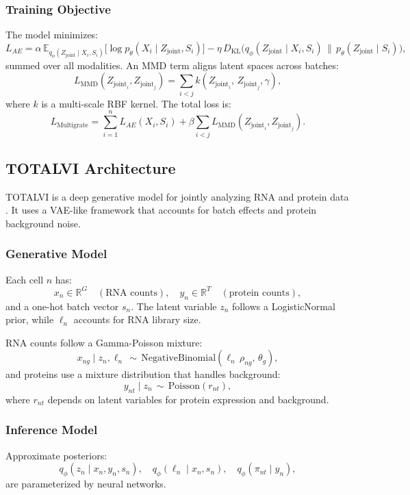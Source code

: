 \documentclass{article}
\begin{document}
\subsubsection{Training Objective}
The model minimizes:
\begin{equation}
    L_{AE} = \alpha \,\mathbb{E}_{q_{\phi}(Z_{\text{joint}} \mid X_i, S_i)}\bigl[\log p_{\theta}(X_i \mid Z_{\text{joint}}, S_i)\bigr]
    - \eta \,D_{\mathrm{KL}}\bigl(q_{\phi}(Z_{\text{joint}} \mid X_i, S_i)\,\|\, p_{\theta}(Z_{\text{joint}} \mid S_i)\bigr),
\end{equation}
summed over all modalities. An MMD term aligns latent spaces across batches:
\[
L_{\mathrm{MMD}}(Z_{\text{joint}_i}, Z_{\text{joint}_j}) 
= \sum_{i<j} k(Z_{\text{joint}_i},\, Z_{\text{joint}_j}, \gamma),
\]
where \(k\) is a multi-scale RBF kernel. The total loss is:
\begin{equation}
    L_{\mathrm{Multigrate}} = \sum_{i=1}^{n} L_{AE}(X_i, S_i) + \beta \sum_{i<j} L_{\mathrm{MMD}}(Z_{\text{joint}_i}, Z_{\text{joint}_j}).
\end{equation}

\subsection{TOTALVI Architecture}
\label{sec:totalvi}
TOTALVI is a deep generative model for jointly analyzing RNA and protein data \cite{gayoso2021joint}. 
It uses a VAE-like framework that accounts for batch effects and protein background noise.

\subsubsection{Generative Model}
Each cell \(n\) has:
\[
x_n \in \mathbb{R}^{G} \quad(\text{RNA counts}), \quad
y_n \in \mathbb{R}^{T} \quad(\text{protein counts}),
\]
and a one-hot batch vector \(s_n\). The latent variable \(z_n\) follows a LogisticNormal prior, 
while \(\ell_n\) accounts for RNA library size.

RNA counts follow a Gamma-Poisson mixture:
\[
x_{ng} \mid z_n, \ell_n \,\sim\, \text{NegativeBinomial}(\ell_n \,\rho_{ng}, \,\theta_g),
\]
and proteins use a mixture distribution that handles background:
\[
y_{nt} \mid z_n \,\sim\, \text{Poisson}(r_{nt}), 
\]
where \(r_{nt}\) depends on latent variables for protein expression and background.

\subsubsection{Inference Model}
Approximate posteriors:
\[
q_{\phi}(z_n \mid x_n, y_n, s_n), \quad
q_{\phi}(\ell_n \mid x_n, s_n), \quad
q_{\phi}(\pi_{nt} \mid y_n), 
\]
are parameterized by neural networks.
\end{document}
